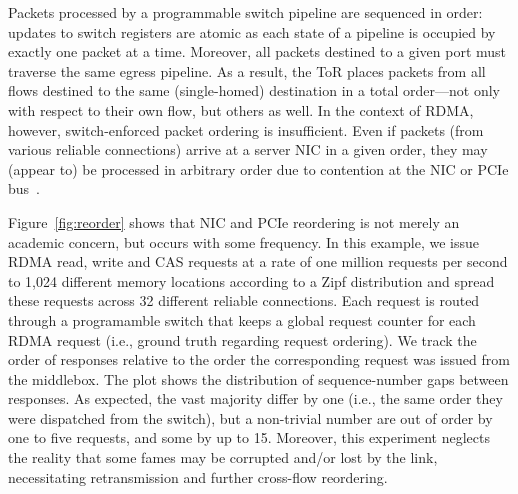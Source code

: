 Packets processed by a programmable switch pipeline are sequenced in
order: updates to switch registers are atomic as each state of a
pipeline is occupied by exactly one packet at a time.  Moreover, all
packets destined to a given port must traverse the same egress
pipeline.  As a result, the ToR places packets from all flows destined
to the same (single-homed) destination in a total order---not only with
respect to their own flow, but others as well.  
%
In the context of RDMA, however, switch-enforced packet ordering is
insufficient.  Even if packets (from various reliable connections)
arrive at a server NIC in a given order, they may (appear to) be
processed in arbitrary order due to contention at the NIC or PCIe
bus~\cite{understanding-pcie}.

Figure~\ref{fig:reorder} shows that NIC
and PCIe reordering is not merely an academic concern, but occurs with
some frequency.  In this example, we issue RDMA read, write and CAS
requests at a rate of one million requests per second to 1,024
different memory locations according to a Zipf distribution and spread
these requests across 32 different reliable connections. Each request is routed
through a programamble switch that keeps a global request counter for
each RDMA request (i.e., ground truth regarding request ordering). We
track the order of responses relative to the order the corresponding
request was issued from the middlebox. The plot shows the distribution
of sequence-number gaps between responses. As expected, the vast
majority differ by one (i.e., the same order they were dispatched from
the switch), but a non-trivial number are out of order by one to five
requests, and some by up to 15.  Moreover, this experiment neglects
the reality that some fames may be corrupted and/or lost by the link,
necessitating retransmission and further cross-flow reordering.






